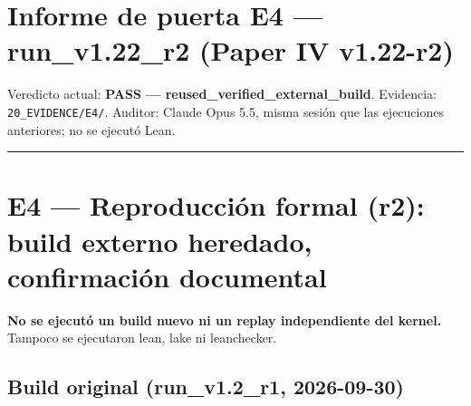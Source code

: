 \documentclass[
]{article}
\author{}
\date{}
\begin{document}
\section{Informe de puerta E4 --- run\_v1.22\_r2 (Paper IV
v1.22-r2)}\label{informe-de-puerta-e4--run_v122_r2-paper-iv-v122-r2}

Veredicto actual: \textbf{PASS --- reused\_verified\_external\_build}.
Evidencia: \texttt{20\_EVIDENCE/E4/}. Auditor: Claude Opus 5.5, misma
sesión que las ejecuciones anteriores; no se ejecutó Lean.

\begin{center}\rule{0.5\linewidth}{0.5pt}\end{center}

\section{E4 --- Reproducción formal (r2): build externo heredado,
confirmación
documental}\label{e4--reproducciuxf3n-formal-r2-build-externo-heredado-confirmaciuxf3n-documental}

\textbf{No se ejecutó un build nuevo ni un replay independiente del
kernel.} Tampoco se ejecutaron lean, lake ni leanchecker.

\subsection{Build original (run\_v1.2\_r1,
2026-09-30)}\label{build-original-run_v12_r1-2026-09-30}
\end{document}
